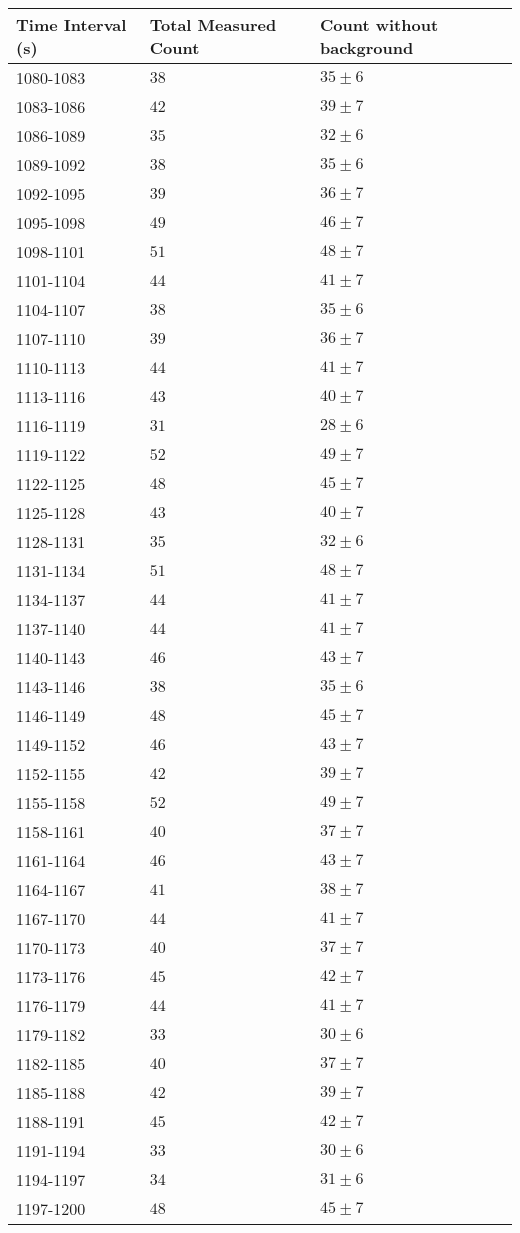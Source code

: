 \begin{tabular}{| p{} | p{} | p{} |}\hline
Time Interval (s) & Total Measured Count & Count without background\\
\hline
1080-1083 & $38$ & $35\pm 6$\\
1083-1086 & $42$ & $39\pm 7$\\
1086-1089 & $35$ & $32\pm 6$\\
1089-1092 & $38$ & $35\pm 6$\\
1092-1095 & $39$ & $36\pm 7$\\
1095-1098 & $49$ & $46\pm 7$\\
1098-1101 & $51$ & $48\pm 7$\\
1101-1104 & $44$ & $41\pm 7$\\
1104-1107 & $38$ & $35\pm 6$\\
1107-1110 & $39$ & $36\pm 7$\\
1110-1113 & $44$ & $41\pm 7$\\
1113-1116 & $43$ & $40\pm 7$\\
1116-1119 & $31$ & $28\pm 6$\\
1119-1122 & $52$ & $49\pm 7$\\
1122-1125 & $48$ & $45\pm 7$\\
1125-1128 & $43$ & $40\pm 7$\\
1128-1131 & $35$ & $32\pm 6$\\
1131-1134 & $51$ & $48\pm 7$\\
1134-1137 & $44$ & $41\pm 7$\\
1137-1140 & $44$ & $41\pm 7$\\
1140-1143 & $46$ & $43\pm 7$\\
1143-1146 & $38$ & $35\pm 6$\\
1146-1149 & $48$ & $45\pm 7$\\
1149-1152 & $46$ & $43\pm 7$\\
1152-1155 & $42$ & $39\pm 7$\\
1155-1158 & $52$ & $49\pm 7$\\
1158-1161 & $40$ & $37\pm 7$\\
1161-1164 & $46$ & $43\pm 7$\\
1164-1167 & $41$ & $38\pm 7$\\
1167-1170 & $44$ & $41\pm 7$\\
1170-1173 & $40$ & $37\pm 7$\\
1173-1176 & $45$ & $42\pm 7$\\
1176-1179 & $44$ & $41\pm 7$\\
1179-1182 & $33$ & $30\pm 6$\\
1182-1185 & $40$ & $37\pm 7$\\
1185-1188 & $42$ & $39\pm 7$\\
1188-1191 & $45$ & $42\pm 7$\\
1191-1194 & $33$ & $30\pm 6$\\
1194-1197 & $34$ & $31\pm 6$\\
1197-1200 & $48$ & $45\pm 7$\\
\hline
\end{tabular}
